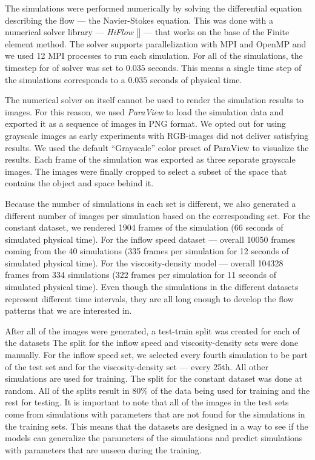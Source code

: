 \documentclass{llncs}
\begin{document}
The simulations were performed numerically by solving the differential equation describing the flow --- the Navier-Stokes equation. This was done with a numerical solver library --- \emph{HiFlow} [] ---  that works on the base of the Finite element method. The solver supports parallelization with MPI and OpenMP and we used 12 MPI processes to run each simulation. For all of the simulations, the timestep for of solver was set to $0.035$ seconds. This means a single time step of the simulations corresponds to a $0.035$ seconds of physical time.

The numerical solver on itself cannot be used to render the simulation results to images. For this reason, we used \emph{ParaView} to load the simulation data and exported it as a sequence of images in PNG format. We opted out for using grayscale images as early experiments with RGB-images did not deliver satisfying results. We used the default ``Grayscale'' color preset of ParaView to visualize the results. Each frame of the simulation was exported as three separate grayscale images. The images were finally cropped to select a subset of the space that contains the object and space behind it.

Because the number of simulations in each set is different, we also generated a different number of images per simulation based on the corresponding set. For the constant dataset, we rendered 1904 frames of the simulation (66 seconds of simulated physical time). For the inflow speed dataset --- overall 10050 frames coming from the 40 simulations (335 frames per simulation for 12 seconds of simulated physical time). For the viscosity-density model --- overall 104328 frames from 334 simulations (322 frames per simulation for 11 seconds of simulated physical time). Even though the simulations in the different datasets represent different time intervals, they are all long enough to develop the flow patterns that we are interested in.

After all of the images were generated, a test-train split was created for each of the datasets The split for the inflow speed and viscosity-density sets were done manually. For the inflow speed set, we selected every fourth simulation to be part of the test set and for the viscosity-density set --- every 25th. All other simulations are used for training. The split for the constant dataset was done at random. All of the splits result in  80\% of the data being used for training and the rest for testing. It is important to note that all of the images in the test sets come from simulations with parameters that are not found for the simulations in the training sets. This means that the datasets are designed in a way to see if the models can generalize the parameters of the simulations and predict simulations with parameters that are unseen during the training.
\end{document}
